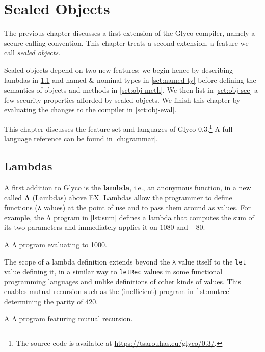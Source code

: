 \documentclass[main.tex]{subfiles}
\begin{document}
\onlyinsubfile{\mainmatter{}}

\chapter{Sealed Objects} \label{ch:obj}
The previous chapter discusses a first extension of the Glyco compiler, namely a secure calling convention. This chapter treats a second extension, a feature we call \emph{sealed objects}.

Sealed objects depend on two new features; we begin hence by describing lambdas in \cref{sct:lambda} and named \& nominal types in \cref{sct:named-ty} before defining the semantics of objects and methods in \cref{sct:obj-meth}. We then list in \cref{sct:obj-sec} a few security properties afforded by sealed objects. We finish this chapter by evaluating the changes to the compiler in \cref{sct:obj-eval}.

This chapter discusses the feature set and languages of Glyco 0.3.\footnote{The source code is available at \url{https://tsarouhas.eu/glyco/0.3/}.} A full language reference can be found in \cref{ch:grammar}.

\section{Lambdas} \label{sct:lambda}
A first addition to Glyco is the \textbf{lambda}, i.e., an anonymous function, in a new  called \textbf{Λ} (Lambdas) above EX. Lambdas allow the programmer to define functions (\texttt{λ} values) at the point of use and to pass them around as values. For example, the Λ program in \cref{lst:sum} defines a lambda that computes the sum of its two parameters and immediately applies it on $1080$ and $-80$.
\begin{listing}[ht]
	\caption{A Λ program evaluating to 1000.}
	\label{lst:sum}
\end{listing}

The scope of a lambda definition extends beyond the \texttt{λ} value itself to the \texttt{let} value defining it, in a similar way to \texttt{letRec} values in some functional programming languages and unlike definitions of other kinds of values. This enables mutual recursion such as the (inefficient) program in \cref{lst:mutrec} determining the parity of 420.
\begin{listing}[ht]
	\caption{A Λ program featuring mutual recursion.}
	\label{lst:mutrec}
\end{listing}
\end{document}
